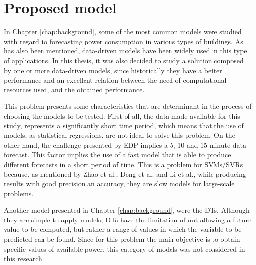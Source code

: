 
\section{Proposed model}\label{chap3:sec:proposed_model}

In Chapter \ref{chap:background}, some of the most common models were studied with regard to forecasting power consumption in various types of buildings. As has also been mentioned, data-driven models have been widely used in this type of applications. In this thesis, it was also decided to study a solution composed by one or more data-driven models, since historically they have a better performance and an excellent relation between the need of computational resources used, and the obtained performance.

This problem presents some characteristics that are determinant in the process of choosing the models to be tested. First of all, the data made available for this study, represents a significantly short time period, which means that the use of models, as statistical regressions, are not ideal to solve this problem. On the other hand, the challenge presented by \ac{EDP} implies a 5, 10 and 15 minute data forecast. This factor implies the use of a fast model that is able to produce different forecasts in a short period of time. This is a problem for \ac{SVM}s/\ac{SVR}s because, as mentioned by Zhao et al.\cite{svm3}, Dong et al.\cite{svm2} and Li et al.\cite{svm5}, while producing results with good precision an accuracy, they are slow models for large-scale problems. 

Another model presented in Chapter \ref{chap:background}, were the \ac{DT}s. Although they are simple to apply models, \ac{DT}s have the limitation of not allowing a future value to be computed, but rather a range of values in which the variable to be predicted can be found. Since for this problem the main objective is to obtain specific values of available power, this category of models was not considered in this research.

